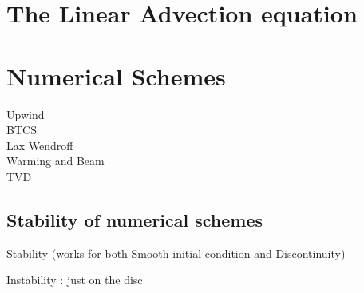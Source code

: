 \documentclass[11pt,a4paper]{article}
\begin{document}
\section{The Linear Advection equation}

\section{Numerical Schemes}
Upwind \\
BTCS\\
Lax Wendroff\\
Warming and Beam \\
TVD \\

\subsection{Stability of numerical schemes}
Stability (works for both Smooth initial condition and
Discontinuity) 

Instability : just on the disc
\end{document}
